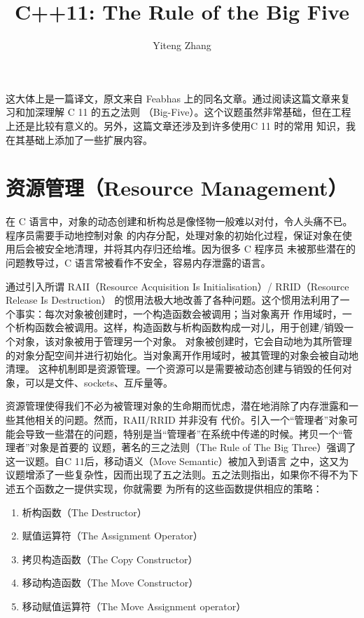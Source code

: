 \documentclass[12pt]{article}
\title{{C++}11: The Rule of the Big Five}
\author{Yiteng Zhang}
\newcommand{\CC}{C\nolinebreak\hspace{-.05em}\raisebox{.4ex}{\tiny\bf +}%
\nolinebreak\hspace{-.10em}\raisebox{.4ex}{\tiny\bf +}}
\begin{document}
\maketitle

\indent{}这大体上是一篇译文，原文来自 Feabhas 上的同名文章。通过阅读这篇文章来复习和加深理解 {\CC}11 的五之法则
（Big-Five）。这个议题虽然非常基础，但在工程上还是比较有意义的。另外，这篇文章还涉及到许多使用{\CC}11 时的常用
知识，我在其基础上添加了一些扩展内容。

\section*{资源管理（Resource Management）}
\indent{}在 C 语言中，对象的动态创建和析构总是像怪物一般难以对付，令人头痛不已。程序员需要手动地控制对象
的内存分配，处理对象的初始化过程，保证对象在使用后会被安全地清理，并将其内存归还给堆。因为很多 C 程序员
未被那些潜在的问题教导过，C 语言常被看作不安全，容易内存泄露的语言。

\indent{}{\CC}通过引入所谓 RAII（Resource Acquisition Is Initialisation）/ RRID（Resource Release Is Destruction）
的惯用法极大地改善了各种问题。这个惯用法利用了一个事实：每次对象被创建时，一个构造函数会被调用；当对象离开
作用域时，一个析构函数会被调用。这样，构造函数与析构函数构成一对儿，用于创建/销毁一个对象，该对象被用于管理另一个对象。
对象被创建时，它会自动地为其所管理的对象分配空间并进行初始化。当对象离开作用域时，被其管理的对象会被自动地清理。
这种机制即是资源管理。一个资源可以是需要被动态创建与销毁的任何对象，可以是文件、sockets、互斥量等。

\indent{}资源管理使得我们不必为被管理对象的生命期而忧虑，潜在地消除了内存泄露和一些其他相关的问题。然而，RAII/RRID 并非没有
代价。引入一个“管理者”对象可能会导致一些潜在的问题，特别是当“管理者”在系统中传递的时候。拷贝一个“管理者”对象是首要的
议题，著名的三之法则（The Rule of The Big Three）强调了这一议题。自{\CC}11后，移动语义（Move Semantic）被加入到语言
之中，这又为议题增添了一些复杂性，因而出现了五之法则。五之法则指出，如果你不得不为下述五个函数之一提供实现，你就需要
为所有的这些函数提供相应的策略：
\begin{enumerate}
    \item 析构函数（The Destructor）
    \item 赋值运算符（The Assignment Operator）
    \item 拷贝构造函数（The Copy Constructor）
    \item 移动构造函数（The Move Constructor）
    \item 移动赋值运算符（The Move Assignment operator）
\end{enumerate}
\end{document}

